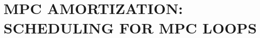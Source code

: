 
%
 
\chapter{MPC AMORTIZATION: SCHEDULING FOR MPC LOOPS}
\label{chapter:chapterfour}
\resetfootnote %















%

